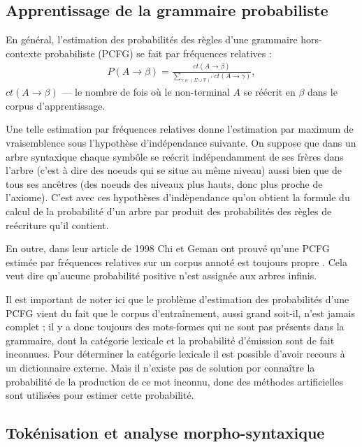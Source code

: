 \documentclass[12pt]{article}
\begin{document}
\subsection{Apprentissage de la grammaire probabiliste}

En g\'en\'eral, l'estimation des probabilit\'es des r\`egles d'une grammaire
hors-contexte probabiliste (PCFG) se fait par fr\'equences relatives :
\begin{eqnarray}
P(A \rightarrow \beta) = \frac{ct(A \rightarrow \beta)}{\sum\limits_{\gamma \in (\Sigma \cup \mathcal{V})^*}{ct(A \rightarrow \gamma)}},
\end{eqnarray}
$ct(A \rightarrow \beta)$ --- le nombre de fois o\`u le non-terminal $A$ se
r\'e\'ecrit en $\beta$ dans le corpus d'apprentissage.

Une telle estimation par fr\'equences relatives donne l'estimation par maximum de vraisemblence
sous l'hypoth\`ese d'ind\'ependance suivante. On suppose que dans un arbre syntaxique chaque
symb\^ole se re\'ecrit ind\'ependamment de ses fr\`eres dans l'arbre (c'est \`a dire des noeuds qui se situe
au m\^eme niveau) aussi bien que de tous ses anc\^etres (des noeuds des niveaux plus hauts, donc plus proche de l'axiome). C'est avec ces hypoth\`eses d'ind\`ependance qu'on obtient la formule du calcul de la probabilit\'e
d'un arbre par produit des probabilit\'es des r\`egles de re\'ecriture qu'il contient.

En outre, dans leur article de 1998 Chi et Geman ont prouv\'e qu'une PCFG estim\'ee par
fr\'equences relatives sur un corpus annot\'e est toujours propre
\cite{proper_PCFG_estimation}. Cela veut dire qu'aucune probabilit\'e positive
n'est assign\'ee aux arbres infinis.

Il est important de noter ici que le probl\`eme d'estimation des probabilit\'es
d'une PCFG vient du fait que le corpus d'entra\^inement, aussi grand soit-il,
n'est jamais complet ; il y a donc toujours des mots-formes qui ne sont pas
pr\'esents dans la grammaire, dont la cat\'egorie lexicale et la
probabilit\'e d'\'emission sont de fait inconnues. Pour d\'eterminer la cat\'egorie
lexicale il est possible d'avoir recours \`a un dictionnaire externe. Mais il
n'existe pas de solution por conna\^itre la probabilit\'e de la production de ce
mot inconnu, donc des m\'ethodes artificielles sont utilis\'ees pour estimer
cette probabilit\'e.


\subsection{Tok\'enisation et analyse morpho-syntaxique}
\end{document}
